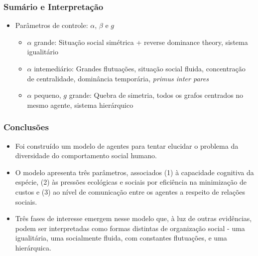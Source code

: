 \documentclass[ignorenonframetext,]{beamer}
\begin{document}
\begin{frame}\frametitle{Sumário e Interpretação}

\begin{itemize}
\itemsep1pt\parskip0pt
\item
  Parâmetros de controle: $\alpha$, $\beta$ e $g$

  \begin{itemize}
  \item
    $\alpha$ grande: Situação social simétrica + reverse dominance
    theory, sistema igualitário
  \item
    $\alpha$ intemediário: Grandes flutuações, situação social fluida,
    concentração de centralidade, dominância temporária, \emph{primus
    inter pares}
  \item
    $\alpha$ pequeno, $g$ grande: Quebra de simetria, todos os grafos
    centrados no mesmo agente, sistema hierárquico
  \end{itemize}
\end{itemize}

\end{frame}

\begin{frame}\frametitle{Conclusões}

\begin{itemize}
\itemsep1pt\parskip0pt
\item
  Foi construído um modelo de agentes para tentar elucidar o problema da
  diversidade do comportamento social humano.
\item
  O modelo apresenta três parâmetros, associados (1) à capacidade
  cognitiva da espécie, (2) às pressões ecológicas e sociais por
  eficiência na minimização de custos e (3) ao nível de comunicação
  entre os agentes a respeito de relações sociais.
\item
  Três fases de interesse emergem nesse modelo que, à luz de outras
  evidências, podem ser interpretadas como formas distintas de
  organização social - uma igualitária, uma socialmente fluida, com
  constantes flutuações, e uma hierárquica.
\end{itemize}

\end{frame}
\end{document}
